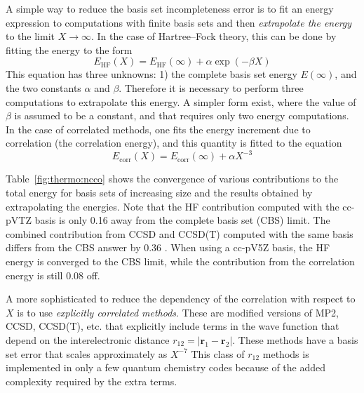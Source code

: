\documentclass[../Main/chem371-notes.tex]{subfiles}
\begin{document}
A simple way to reduce the basis set incompleteness error is to fit an energy expression to computations with finite basis sets and then \emph{extrapolate the energy} to the limit $X \rightarrow \infty$.
In the case of Hartree--Fock theory, this can be done by fitting the energy to the form
\begin{equation}
E_\mathrm{HF}(X) = E_\mathrm{HF}(\infty) + \alpha \exp(-\beta X)
\end{equation}
This equation has three unknowns: 1) the complete basis set energy $E(\infty)$, and the two constants $\alpha$ and $\beta$.
Therefore it is necessary to perform three computations to extrapolate this energy.
A simpler form exist, where the value of $\beta$ is assumed to be a constant, and that requires only two energy computations.
In the case of correlated methods, one fits the energy increment due to correlation (the correlation energy), and this quantity is fitted to the equation
\begin{equation}
E_\mathrm{corr}(X) = E_\mathrm{corr}(\infty) + \alpha X^{-3}
\end{equation}

Table~\ref{fig:thermo:ncco} shows the convergence of various contributions to the total energy for basis sets of increasing size and the results obtained by extrapolating the energies.
Note that the HF contribution computed with the cc-pVTZ basis is only 0.16 \kcal away from the complete basis set (CBS) limit.
The combined contribution from CCSD and CCSD(T) computed with the same basis differs from the CBS answer by 0.36 \kcal.
When using a cc-pV5Z basis, the HF energy is converged to the CBS limit, while the contribution from the correlation energy is still 0.08 \kcal off.


A more sophisticated to reduce the dependency of the correlation with respect to $X$ is to use \emph{explicitly correlated methods}. These are modified versions of MP2, CCSD, CCSD(T), etc. that explicitly include terms in the wave function that depend on the interelectronic distance $r_{12} = | \mathbf{r}_1 - \mathbf{r}_2|$. These methods have a basis set error that scales approximately as $X^{-7}$
This class of $r_{12}$ methods is implemented in only a few quantum chemistry codes because of the added complexity required by the extra terms.
\end{document}
